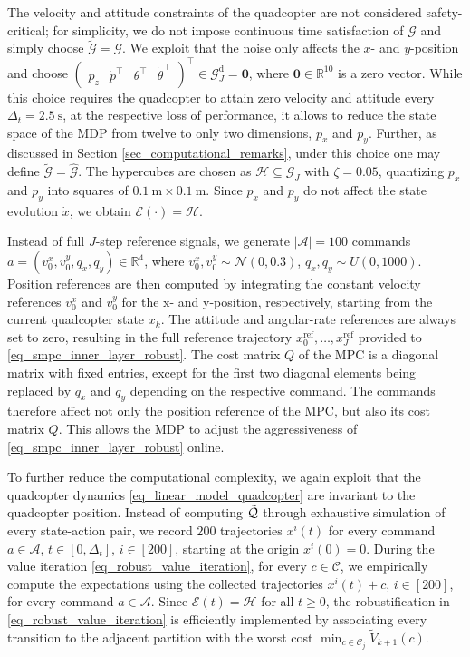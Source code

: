 \documentclass{IEEEtran}
\begin{document}
The velocity and attitude constraints of the quadcopter are not considered safety-critical; for simplicity, we do not impose continuous time satisfaction of $\mathcal{G}$ and simply choose $\tilde{\mathcal{G
}}=\mathcal{G}$. We exploit that the noise only affects the $x$- and $y$-position and choose $\begin{pmatrix}
    p_z & \dot p^{\top} & \theta^{\top} & \dot \theta^{\top} 
\end{pmatrix}^{\top}\in\mathcal{G}_J^{\text{d}}=\textbf{0}$, where $\textbf{0}\in\mathbb{R}^{10}$ is a zero vector. While this choice requires the quadcopter to attain zero velocity and attitude every $\Delta_t=\SI{2.5}{\second}$, at the respective loss of performance, it allows to reduce the state space of the MDP from twelve to only two dimensions, $p_x$ and $p_y$. Further, as discussed in Section \ref{sec_computational_remarks}, under this choice one may define $\tilde{\mathcal{G}}=\hat{\mathcal{G}}$. The hypercubes are chosen as $\mathcal{H}\subseteq \mathcal{G}_J$ with $\zeta=0.05$, quantizing $p_x$ and $p_y$ into squares of $\SI{0.1}{\meter}\times\SI{0.1}{\meter}$. Since $p_x$ and $p_y$ do not affect the state evolution $\dot x$, we obtain $\mathcal{E}(\cdot)=\mathcal{H}$. 

Instead of full $J$-step reference signals, we generate $|\mathcal{A}|=100$ commands $a=(v_0^x,v_0^y,q_x,q_y)\in\mathbb{R}^4$, where $v_0^x,v_0^y\sim\mathcal{N}(0,0.3)$, $q_x,q_y\sim U(0,1000)$. Position references are then computed by integrating the constant velocity references $v_0^x$ and $v_0^y$ for the x- and y-position, respectively, starting from the current quadcopter state $x_k$. The attitude and angular-rate references are always set to zero, resulting in the full reference trajectory $x_0^{\text{ref}}, \dots, x_J^{\text{ref}}$ provided to \eqref{eq_smpc_inner_layer_robust}. The cost matrix $Q$
of the MPC is a diagonal matrix with fixed entries, except for the first two diagonal elements being replaced by $q_x$ and $q_y$ depending on the respective command. The commands therefore affect not only the position reference of the MPC, but also its cost matrix $Q$. This allows the MDP to adjust the aggressiveness of \eqref{eq_smpc_inner_layer_robust} online.

To further reduce the computational complexity, we again exploit that the quadcopter dynamics \eqref{eq_linear_model_quadcopter} are invariant to the quadcopter position. Instead of computing $\Tilde{\mathcal{Q}}$ through exhaustive simulation of every state-action pair, we record $200$ trajectories $x^i(t)$ for every command $a\in\mathcal{A}$, $t\in[0,\Delta_t]$, $i\in[200]$, starting at the origin $x^i(0)=0$. During the value iteration \eqref{eq_robust_value_iteration}, for every $c\in\mathcal{C}$, we empirically compute the expectations using the collected trajectories $x^i(t)+c$, $i\in[200]$, for every command $a\in\mathcal{A}$.
Since $\mathcal{E}(t)=\mathcal{H}$ for all $t\geq 0$, the robustification in \eqref{eq_robust_value_iteration} is efficiently implemented by associating every transition to the adjacent partition with the worst cost $\min_{c\in\mathcal{C}_j}\tilde{V}_{k+1}(c)$. 
\end{document}
